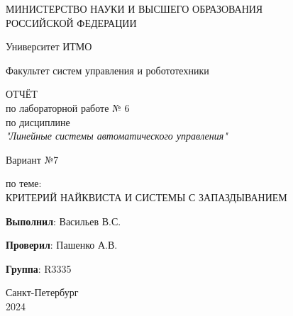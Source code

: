 \thispagestyle{empty}

\begin{center}
    МИНИСТЕРСТВО НАУКИ И ВЫСШЕГО ОБРАЗОВАНИЯ \\ РОССИЙСКОЙ ФЕДЕРАЦИИ

    \vspace{20pt}

    Университет ИТМО

    \vspace{20pt}

    Факультет систем управления и робототехники
\end{center}

\vfill

\begin{center}
    ОТЧЁТ \\  
    по лабораторной работе № 6\\
    по дисциплине \\
    \textit{"Линейные системы автоматического управления"}

    
    \vspace{20pt}
    
    Вариант №7

    \vspace{20pt}

    по теме: \\
    \uppercase{Критерий Найквиста и системы с запаздыванием}
\end{center}

\vfill
\hfil

    \noindent \hfill \textbf{Выполнил}: Васильев В.С.

    \vspace{20pt}

    \noindent \hfill \textbf{Проверил}: Пашенко А.В.

    \vspace{20pt}

    \noindent \hfill \textbf{Группа}: R3335

\vfill
\hfil

\begin{center}
    Санкт-Петербург \\ 2024
\end{center}